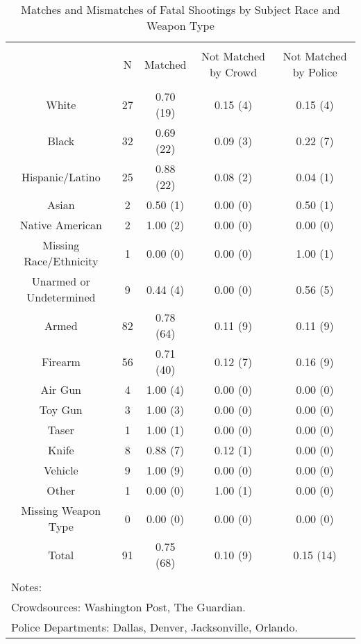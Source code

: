 
\begin{table}[!htbp] \centering 
  \caption{Matches and Mismatches of Fatal Shootings by Subject Race and Weapon Type} 
  \label{} 
\footnotesize 
\begin{tabular}{@{\extracolsep{5pt}} ccccc} 
\\[-1.8ex]\hline 
\hline \\[-1.8ex] 
 & N & Matched & Not Matched by Crowd & Not Matched by Police \\ 
\hline \\[-1.8ex] 
White & 27 & 0.70 (19) & 0.15 (4) & 0.15 (4) \\ 
Black & 32 & 0.69 (22) & 0.09 (3) & 0.22 (7) \\ 
Hispanic/Latino & 25 & 0.88 (22) & 0.08 (2) & 0.04 (1) \\ 
Asian & 2 & 0.50 (1) & 0.00 (0) & 0.50 (1) \\ 
Native American & 2 & 1.00 (2) & 0.00 (0) & 0.00 (0) \\ 
Missing Race/Ethnicity & 1 & 0.00 (0) & 0.00 (0) & 1.00 (1) \\ 
Unarmed or Undetermined & 9 & 0.44 (4) & 0.00 (0) & 0.56 (5) \\ 
Armed & 82 & 0.78 (64) & 0.11 (9) & 0.11 (9) \\ 
Firearm & 56 & 0.71 (40) & 0.12 (7) & 0.16 (9) \\ 
Air Gun & 4 & 1.00 (4) & 0.00 (0) & 0.00 (0) \\ 
Toy Gun & 3 & 1.00 (3) & 0.00 (0) & 0.00 (0) \\ 
Taser & 1 & 1.00 (1) & 0.00 (0) & 0.00 (0) \\ 
Knife & 8 & 0.88 (7) & 0.12 (1) & 0.00 (0) \\ 
Vehicle & 9 & 1.00 (9) & 0.00 (0) & 0.00 (0) \\ 
Other & 1 & 0.00 (0) & 1.00 (1) & 0.00 (0) \\ 
Missing Weapon Type & 0 & 0.00 (0) & 0.00 (0) & 0.00 (0) \\ 
Total & 91 & 0.75 (68) & 0.10 (9) & 0.15 (14) \\ 
\hline \\[-1.8ex] 
\multicolumn{5}{l}{Notes:} \\ 
\multicolumn{5}{l}{Crowdsources: Washington Post, The Guardian.} \\ 
\multicolumn{5}{l}{Police Departments: Dallas, Denver, Jacksonville, Orlando.} \\ 
\end{tabular} 
\end{table}  
